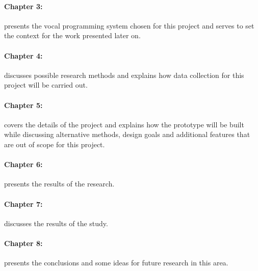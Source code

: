 \documentclass[../thesis.tex]{subfiles}
\begin{document}
\paragraph{Chapter 3: } presents the vocal programming system chosen for this project
and serves to set the context for the work presented later on.
\paragraph{Chapter 4: } discusses possible research methods and explains
how data collection for this project will be carried out.
\paragraph{Chapter 5: } covers the details of the project and explains
how the prototype will be built while discussing alternative methods, design goals
and additional features that are out of scope for this project.
\paragraph{Chapter 6: } presents the results of the research.
\paragraph{Chapter 7: } discusses the results of the study.
\paragraph{Chapter 8: } presents the conclusions and some ideas for future research in this area.
\end{document}

